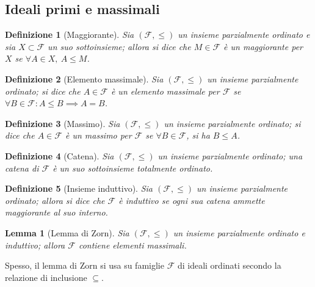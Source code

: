 \documentclass[12pt]{scrartcl}
\theoremstyle{style}
\newtheorem{definizione}{Definizione}[section]
\newtheorem{lemma}{Lemma}[teorema]
\numberwithin{equation}{subsection}
\begin{document}
\subsection{Ideali primi e massimali}
\begin{definizione}
	[Maggiorante]
	Sia $(\mathcal{F} ,\le )$ un insieme parzialmente ordinato e sia $X \subset \mathcal{F} $ un suo sottoinsieme; allora si dice che $M \in \mathcal{F} $ \`e un \textit{maggiorante} per $X$ se $\forall A\in X , \ A\le M$.
\end{definizione}
\begin{definizione}
	[Elemento massimale]
	Sia $(\mathcal{F} ,\le )$ un insieme parzialmente ordinato; si dice che $A \in \mathcal{F} $ \`e un \textit{elemento massimale} per $\mathcal{F} $ se $\forall B \in \mathcal{F} : A\le B \implies A= B$.
\end{definizione}
\begin{definizione}
	[Massimo]
	Sia $(\mathcal{F} ,\le )$ un insieme parzialmente ordinato; si dice che $A \in \mathcal{F} $ \`e un \textit{massimo} per $\mathcal{F} $ se $\forall B \in \mathcal{F} $, si ha $B \le A$.
\end{definizione}
\begin{definizione}
	[Catena]
	Sia $(\mathcal{F} ,\le )$ un insieme parzialmente ordinato; una \textit{catena} di $\mathcal{F} $ \`e un suo sottoinsieme totalmente ordinato.
\end{definizione}
\begin{definizione}
	[Insieme induttivo]
		Sia $(\mathcal{F} ,\le )$ un insieme parzialmente ordinato; allora si dice che $\mathcal{F} $ \`e \textit{induttivo} se ogni sua catena ammette maggiorante al suo interno.
\end{definizione}
\begin{lemma}
	[Lemma di Zorn]
	Sia $(\mathcal{F},\le ) $ un insieme parzialmente ordinato e induttivo; allora $\mathcal{F} $ contiene elementi massimali.
\end{lemma}
\noindent Spesso, il lemma di Zorn si usa su famiglie $\mathcal{F} $ di ideali ordinati secondo la relazione di inclusione $\subseteq$.
\end{document}
